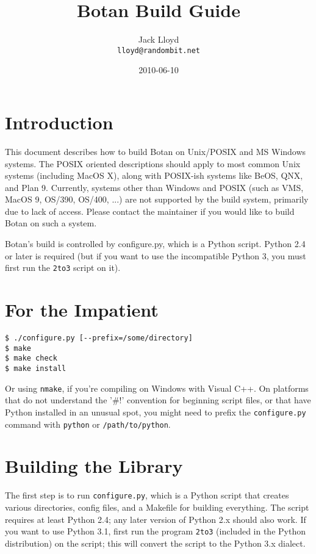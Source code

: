 \documentclass{article}
\title{\textbf{Botan Build Guide}}
\author{Jack Lloyd \\
        \texttt{lloyd@randombit.net}}
\date{2010-06-10}
\newcommand{\filename}[1]{\texttt{#1}}
\begin{document}
\maketitle

\tableofcontents

\parskip=5pt
\pagebreak

\section{Introduction}

This document describes how to build Botan on Unix/POSIX and MS
Windows systems. The POSIX oriented descriptions should apply to most
common Unix systems (including MacOS X), along with POSIX-ish systems
like BeOS, QNX, and Plan 9. Currently, systems other than Windows and
POSIX (such as VMS, MacOS 9, OS/390, OS/400, ...) are not supported by
the build system, primarily due to lack of access. Please contact the
maintainer if you would like to build Botan on such a system.

Botan's build is controlled by configure.py, which is a Python
script. Python 2.4 or later is required (but if you want to use the
incompatible Python 3, you must first run the \texttt{2to3} script on
it).

\section{For the Impatient}

\begin{verbatim}
$ ./configure.py [--prefix=/some/directory]
$ make
$ make check
$ make install
\end{verbatim}

Or using \verb|nmake|, if you're compiling on Windows with Visual
C++. On platforms that do not understand the '\#!' convention for
beginning script files, or that have Python installed in an unusual
spot, you might need to prefix the \texttt{configure.py} command with
\texttt{python} or \texttt{/path/to/python}.

\section{Building the Library}

The first step is to run \filename{configure.py}, which is a Python
script that creates various directories, config files, and a Makefile
for building everything. The script requires at least Python 2.4; any
later version of Python 2.x should also work. If you want to use
Python 3.1, first run the program \texttt{2to3} (included in the
Python distribution) on the script; this will convert the script to
the Python 3.x dialect.
\end{document}
